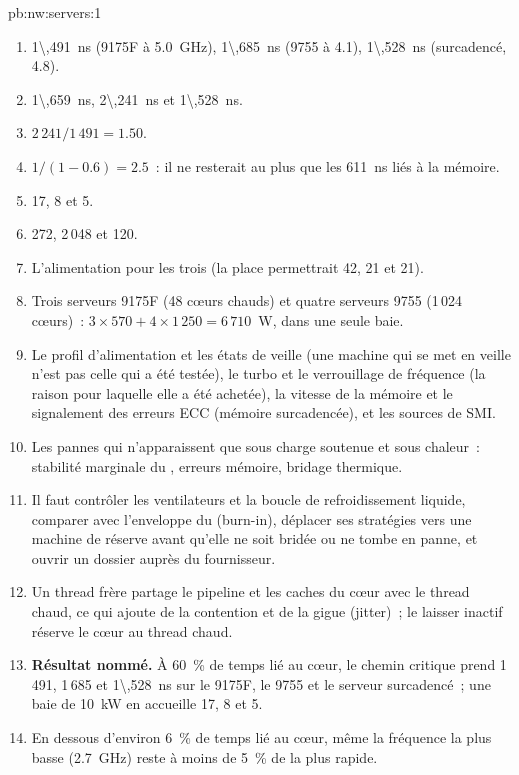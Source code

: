 \begin{solution}{pb:nw:servers:1}
\begin{enumerate}
\item \qty{1\,491}{\nano\second} (9175F à 5.0~GHz), \qty{1\,685}{\nano\second} (9755 à 4.1), \qty{1\,528}{\nano\second} (surcadencé, 4.8).
\item \qty{1\,659}{\nano\second}, \qty{2\,241}{\nano\second} et \qty{1\,528}{\nano\second}.
\item $2\,241 / 1\,491 = 1.50$.
\item $1/(1 - 0.6) = 2.5$~: il ne resterait au plus que les \qty{611}{\nano\second} liés à la mémoire.
\item 17, 8 et 5.
\item 272, 2\,048 et 120.
\item L'alimentation pour les trois (la place permettrait 42, 21 et 21).
\item Trois serveurs 9175F (48 cœurs chauds) et quatre serveurs 9755 (1\,024 cœurs)~: $3 \times 570 + 4 \times 1\,250 = 6\,710$~W, dans une seule baie.
\item Le profil d'alimentation et les états de veille (une machine qui se met en veille n'est pas celle qui a été testée), le turbo et le verrouillage de fréquence (la raison pour laquelle elle a été
  achetée), la vitesse de la mémoire et le signalement des erreurs ECC (mémoire surcadencée), et les sources de SMI.
\item Les pannes qui n'apparaissent que sous charge soutenue et sous chaleur~: stabilité marginale du , erreurs mémoire, bridage thermique.
\item Il faut contrôler les ventilateurs et la boucle de refroidissement liquide, comparer avec l'enveloppe du  (burn-in), déplacer ses stratégies vers une machine de réserve avant qu'elle ne soit bridée ou ne tombe en panne,
  et ouvrir un dossier auprès du fournisseur.
\item Un thread frère partage le pipeline et les caches du cœur avec le thread chaud, ce qui ajoute de la contention et de la gigue (jitter)~; le laisser inactif réserve le cœur
  au thread chaud.
\item \textbf{Résultat nommé.} À 60~\% de temps lié au cœur, le chemin critique prend 1\,491, 1\,685 et \qty{1\,528}{\nano\second} sur le 9175F, le 9755 et le
  serveur surcadencé~; une baie de \qty{10}{\kilo\watt} en accueille 17, 8 et 5.
\item En dessous d'environ 6~\% de temps lié au cœur, même la fréquence la plus basse (2.7~GHz) reste à moins de 5~\% de la plus rapide.

\end{enumerate}
\end{solution}
